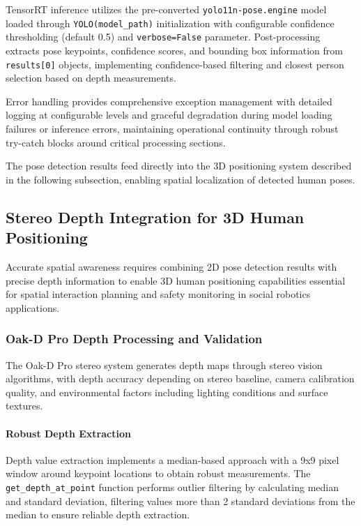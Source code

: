 TensorRT inference utilizes the pre-converted \texttt{yolo11n-pose.engine} model loaded through \texttt{YOLO(model\_path)} initialization with configurable confidence thresholding (default 0.5) and \texttt{verbose=False} parameter. Post-processing extracts pose keypoints, confidence scores, and bounding box information from \texttt{results[0]} objects, implementing confidence-based filtering and closest person selection based on depth measurements.

Error handling provides comprehensive exception management with detailed logging at configurable levels and graceful degradation during model loading failures or inference errors, maintaining operational continuity through robust try-catch blocks around critical processing sections.

The pose detection results feed directly into the 3D positioning system described in the following subsection, enabling spatial localization of detected human poses.

\subsection{Stereo Depth Integration for 3D Human Positioning}

Accurate spatial awareness requires combining 2D pose detection results with precise depth information to enable 3D human positioning capabilities essential for spatial interaction planning and safety monitoring in social robotics applications.

\subsubsection{Oak-D Pro Depth Processing and Validation}

The Oak-D Pro stereo system generates depth maps through stereo vision algorithms, with depth accuracy depending on stereo baseline, camera calibration quality, and environmental factors including lighting conditions and surface textures.

\paragraph{Robust Depth Extraction}

Depth value extraction implements a median-based approach with a 9x9 pixel window around keypoint locations to obtain robust measurements. The \texttt{get\_depth\_at\_point} function performs outlier filtering by calculating median and standard deviation, filtering values more than 2 standard deviations from the median to ensure reliable depth extraction.

